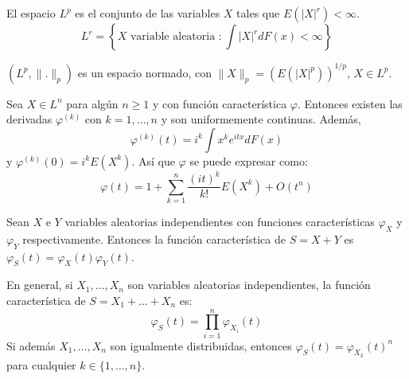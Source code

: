 \begin{definition}
    El espacio $L^p$ es el conjunto de las variables $X$ tales que $E(|X|^r) < \infty$.
    $$L^r = \left\{X \text{ variable aleatoria } : \int |X|^rdF(x) < \infty\right\}$$

    $(L^p, \|.\|_p)$ es un espacio normado, con $\|X\|_p = (E(|X|^p))^{1/p}$, $X \in L^p$.
\end{definition}

\begin{theorem}
    Sea $X \in L^n$ para algún $n \geq 1$ y con función característica $\varphi$.
    Entonces existen las derivadas $\varphi^{(k)}$ con $k = 1, \dots, n$ y son uniformemente continuas.
    Además,
    $$\varphi^{(k)}(t) = i^k \int x^ke^{itx}dF(x)$$
    y $\varphi^{(k)}(0) = i^kE(X^k)$.
    Así que $\varphi$ se puede expresar como:
    $$\varphi(t) = 1 + \sum_{k=1}^n \frac{(it)^k}{k!}E(X^k) + O(t^n)$$
\end{theorem}

\begin{proposition}
    Sean $X$ e $Y$ variables aleatorias independientes con funciones características $\varphi_X$ y $\varphi_Y$ respectivamente.
    Entonces la función característica de $S = X+Y$ es $\varphi_S(t) = \varphi_X(t)\varphi_Y(t)$.
\end{proposition}

En general, si $X_1, \dots, X_n$ son variables aleatorias independientes, la función característica de $S = X_1 + \dots + X_n$ es:
$$\varphi_S(t) = \prod_{i=1}^n \varphi_{X_i}(t)$$
Si además $X_1, \dots, X_n$ son igualmente distribuidas, entonces $\varphi_S(t) = \varphi_{X_k}(t)^n$ para cualquier $k \in \{1, \dots, n\}$.

